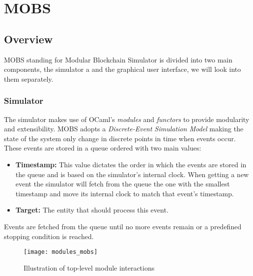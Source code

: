 
%

\chapter{MOBS}\label{cha:mobs}

\section{Overview}\label{sub:overview}

MOBS standing for Modular Blockchain Simulator is divided into two main components,
the simulator a and the graphical user interface, we will look into them separately.

\subsection{Simulator}\label{subsec:simulator}

The simulator makes use of OCaml's \textit{modules} and \textit{functors} to
provide modularity and extensibility. MOBS adopts a \textit{Discrete-Event Simulation Model}
making the state of the system only change in discrete points in time when events occur.
These events are stored in a queue ordered with two main values:
\begin{itemize}
  \item \textbf{Timestamp:} This value dictates the order in which the events are
stored in the queue and is based on the simulator's internal clock. When getting
a new event the simulator will fetch from the queue the one with the smallest timestamp
and move its internal clock to match that event's timestamp.
  \item \textbf{Target:} The entity that should process this event.
\end{itemize}
Events are fetched from the queue until no more events remain or a predefined
stopping condition is reached.

\begin{figure}[h]
	\centering
	\texttt{[image: modules\_mobs]}
	\caption{Illustration of top-level module interactions}
	\label{fig:modules_mobs}
\end{figure}

